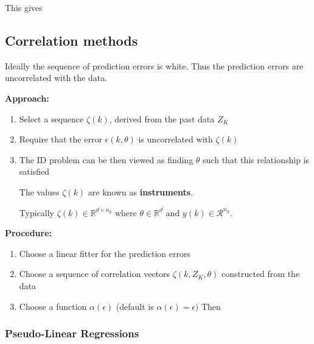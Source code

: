 \documentclass[10pt,a4paper]{scrartcl}
\begin{document}
\begin{multicols*}{2}
This gives


\subsection{Correlation methods}

Ideally the sequence of prediction errors is white. Thus the prediction errors are uncorrelated with the data.


\textbf{Approach:}
\begin{enumerate}
\item Select a sequence $\zeta(k)$, derived from the past data $Z_K$
\item Require that the error $\epsilon(k,\theta)$ is uncorrelated with $\zeta(k)$
\item The ID problem can be then viewed as finding $\theta$ such that this relationship is satisfied

The values $\zeta(k)$ are known as \textbf{instruments}.

Typically $\zeta(k)\in\mathbb{R}^{d\times n_y}$ where $\theta\in\mathbb{R}^d$ and $y(k)\in\mathcal{R}^{n_y}$.
\end{enumerate}

\textbf{Procedure:}
\begin{enumerate}
\item Choose a linear fitter for the prediction errors


\item Choose a sequence of correlation vectors $\zeta(k,Z_K,\theta)$ constructed from the data
\item Choose a function $\alpha(\epsilon)$ (default is $\alpha(\epsilon)=\epsilon)$ Then

\end{enumerate}

\subsubsection{Pseudo-Linear Regressions}


\end{multicols*}
\end{document}
